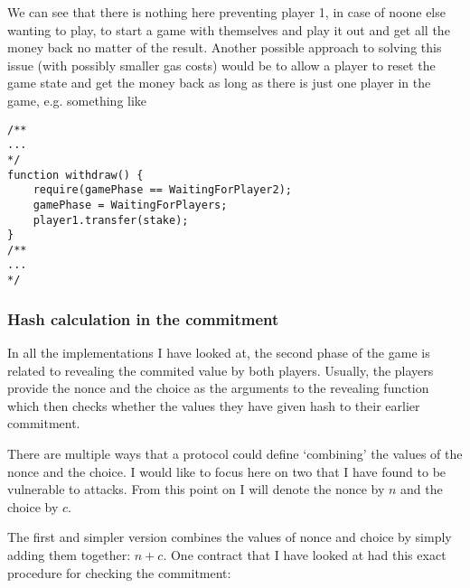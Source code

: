 \documentclass{article}
\begin{document}
    \noindent We can see that there is nothing here
    preventing player 1, in case of noone else wanting to
    play, to start a game with themselves and play it out
    and get all the money back no matter of the result.
    Another possible approach to solving this issue (with
    possibly smaller gas costs) would be to allow a player
    to reset the game state and get the money back as long
    as there is just one player in the game, e.g. something
    like

    \begin{lstlisting}[language=Solidity]
/**
...
*/
function withdraw() {
    require(gamePhase == WaitingForPlayer2);
    gamePhase = WaitingForPlayers;
    player1.transfer(stake);
}
/**
...
*/
    \end{lstlisting}

    \subsubsection{Hash calculation in the commitment}
    In all the implementations I have looked at, the second
    phase of the game is related to revealing the commited
    value by both players. Usually, the players provide the
    nonce and the choice as the arguments to the revealing
    function which then checks whether the values they have
    given hash to their earlier commitment.
    \newline

    \noindent There are multiple ways that a protocol could
    define `combining' the values of the nonce and the
    choice. I would like to focus here on two that I have
    found to be vulnerable to attacks. From this point on I
    will denote the nonce by \(n\) and the choice by \(c\).
    \newline

    \noindent The first and simpler version combines the
    values of nonce and choice by simply adding them
    together: \(n + c\). One contract that I have looked at
    had this exact procedure for checking the commitment:
\end{document}
